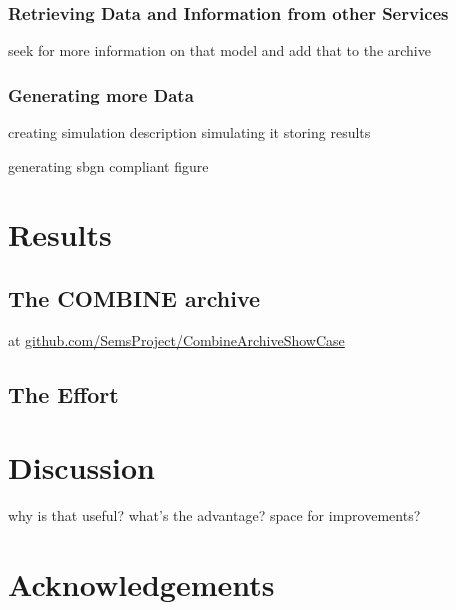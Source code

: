 \documentclass[a4paper,10pt]{scrartcl}
\begin{document}
\subsubsection{Retrieving Data and Information from other Services}
seek for more information on that model
and add that to the archive

\subsubsection{Generating more Data}
creating simulation description
simulating it
storing results

generating sbgn compliant figure

\section{Results}

\subsection{The COMBINE archive}
at 
\href{https://github.com/SemsProject/CombineArchiveShowCase}{github.com/SemsProject/CombineArchiveShowCase}

\subsection{The Effort}




\section{Discussion}

why is that useful?
what's the advantage?
space for improvements?

\section{Acknowledgements}
\end{document}
